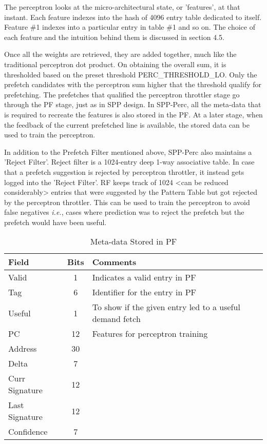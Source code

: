 \documentclass{sig-alternate}
\begin{document}
The perceptron looks at the micro-architectural state, or 'features', at that instant. 
Each feature indexes into the hash of 4096 entry table dedicated to itself. 
Feature \#1 indexes into a particular entry in table \#1 and so on. 
The choice of each feature and the intuition behind them is discussed in section 4.5.

Once all the weights are retrieved, they are added together, much like the traditional perceptron dot product. 
On obtaining the overall sum, it is thresholded based on the preset threshold PERC\_THRESHOLD\_LO. 
Only the prefetch candidates with the perceptron sum higher that the threshold qualify for prefetching. 
The prefetches that qualified the perceptron throttler stage go through the PF stage, just as in SPP design. 
In SPP-Perc, all the meta-data that is required to recreate the features is also stored in the PF. 
At a later stage, when the feedback of the current prefetched line is available, the stored data can be used to train the perceptron. 

In addition to the Prefetch Filter mentioned above, SPP-Perc also maintains a 'Reject Filter'. 
Reject filter is a 1024-entry deep 1-way associative table. 
In case that a prefetch suggestion is rejected by perceptron throttler, it instead gets logged into the 'Reject Filter'. 
RF keeps track of 1024 <can be reduced considerably> entries that were suggested by the Pattern Table but got rejected by the perceptron throttler. 
This can be used to train the perceptron to avoid false negatives \textit{i.e.}, cases where prediction was to reject the prefetch but the prefetch would have been useful.
\begin{table}[]
    \centering
    \begin{tabular}{|l|c|p{4.6cm}|}
    \hline
    Field &
    Bits &
    Comments \\
    \hline
         Valid & 1 & Indicates a valid entry in PF\\
         Tag & 6 & Identifier for the entry in PF\\
         Useful & 1 & To show if the given entry led to a useful demand fetch\\
         PC & 12 & Features for perceptron training \\
         Address & 30 & \\
         Delta & 7 & \\
         Curr Signature & 12 & \\
         Last Signature & 12 & \\
         Confidence & 7 & \\
    \hline
    \end{tabular}
    \caption{Meta-data Stored in PF}
    \label{tab:PF_metadata}
\end{table}
\end{document}
